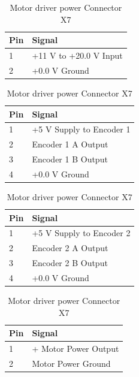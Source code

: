 \documentclass[11pt,a4paper]{article}
\begin{document}
  \begin{table}[h!]
    \flushleft

    \begin{minipage}{0.45\textwidth}
      \begin{tabular}[b]{|p{7mm}|p{4.5cm}|}
        \hline \textbf{Pin} & \textbf{Signal}\\
        \hline 1 & +11 V to +20.0 V Input\\
        \hline 2 & +0.0 V Ground\\
        \hline
      \end{tabular}
      \caption{Connector X1}
      \vspace{25pt}
    \end{minipage}\hfill
    \begin{minipage}{0.45\textwidth}
      \begin{tabular}[b]{|p{7mm}|p{4.5cm}|}
        \hline \textbf{Pin} & \textbf{Signal}\\
        \hline  1 & +5 V Supply to Encoder 1\\
        \hline  2 & Encoder 1 A Output\\
        \hline  3 & Encoder 1 B Output\\
        \hline  4 & +0.0 V Ground\\
        \hline
      \end{tabular}
      \caption{Encoder 1 Connector X5}
      \vspace{25pt}
    \end{minipage}\hfill
    \begin{minipage}{0.45\textwidth}
      \begin{tabular}[b]{|p{7mm}|p{4.5cm}|}
        \hline \textbf{Pin} & \textbf{Signal}\\
        \hline 1 & +5 V Supply to Encoder 2\\
        \hline 2 & Encoder 2 A Output\\
        \hline 3 & Encoder 2 B Output\\
        \hline 4 & +0.0 V Ground \\
        \hline
      \end{tabular}
      \caption{Encoder 2 Connector X6}
      \vspace{25pt}
    \end{minipage}\hfill
    \begin{minipage}{0.45\textwidth}
      \begin{tabular}[b]{|p{7mm}|p{4.5cm}|}
        \hline \textbf{Pin} & \textbf{Signal}\\
        \hline 1 & + Motor Power Output\\
        \hline 2 & Motor Power Ground \\
        \hline
      \end{tabular}
      \caption{Motor driver power Connector X7}
    \end{minipage}\hfill
  \end{table}
\end{document}
